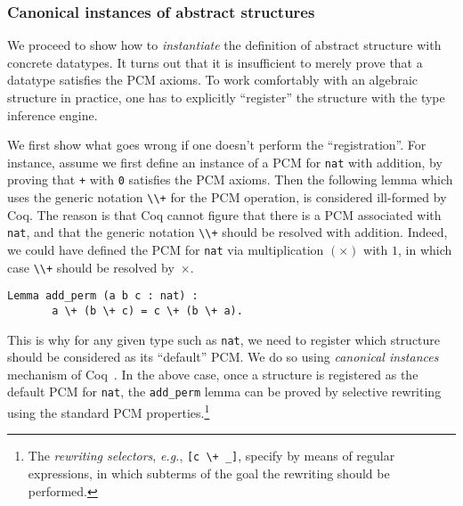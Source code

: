 \documentclass[blockstyle,preprint,nocopyrightspace]{sigplanconf}
\newcommand{\is}[1]{\textcolor{blue}{(Ilya: {#1})}}
\newcommand{\an}[1]{\textcolor{red}{(Aleks: {#1})}}
\newcommand{\code}[1]{\lstinline{#1}}
\newcommand{\eg}{\emph{e.g.}\xspace}
\begin{document}
\subsubsection{Canonical instances of abstract structures}
\label{sec:canonicals}
We proceed to show how to \emph{instantiate} the definition of
abstract structure with concrete datatypes. It turns out that it is
insufficient to merely prove that a datatype satisfies the PCM
axioms. To work comfortably with an algebraic structure in practice,
one has to explicitly ``register'' the structure with the type
inference engine.

We first show what goes wrong if one doesn't perform the
``registration''.  For instance, assume we first define an instance of
a PCM for \code{nat} with addition, by proving that \code{+} with
\code{0} satisfies the PCM axioms.  Then the following lemma which
uses the generic notation \code{\\+} for the PCM operation, is
considered ill-formed by Coq. The reason is that Coq cannot figure
that there is a PCM associated with \code{nat}, and that the generic
notation \code{\\+} should be resolved with addition. Indeed, we could
have defined the PCM for \code{nat} via multiplication $(\times)$ with
$1$, in which case \code{\\+} should be resolved by~$\times$.
%
\begin{lstlisting}
Lemma add_perm (a b c : nat) : 
       a \+ (b \+ c) = c \+ (b \+ a).
\end{lstlisting}
%
This is why for any given type such as \code{nat}, we need to register
which structure should be considered as its ``default'' PCM. We do so
using \emph{canonical instances} mechanism of
Coq~\cite{Mahboubi-Tassi:ITP13,Saibi:PhD}. In the above case, once a
structure is registered as the default PCM for \code{nat}, the
\code{add_perm} lemma can be proved by selective rewriting using the
standard PCM properties.\footnote{The \emph{rewriting selectors}, \eg,
  \code{[c \+ _]}, specify by means of regular expressions, in which
  subterms of the goal the rewriting should be performed.}
%
%
\end{document}

